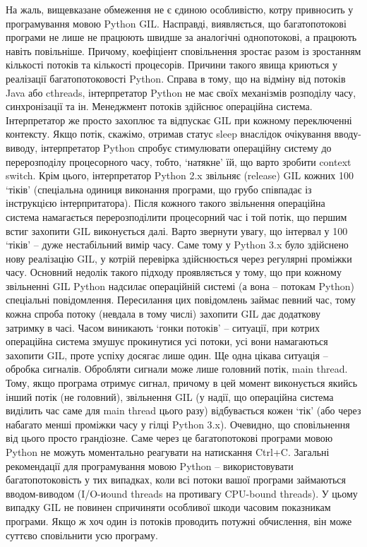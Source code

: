 \documentclass[a4paper, 12pt, onsedie]{article}
\begin{document}
    На жаль, вищевказане обмеження не є єдиною особливістю, котру привносить у програмування
    мовою Python GIL. Насправді, виявляється, що багатопотокові програми не лише не працюють
    швидше за аналогічні однопотокові, а працюють навіть повільніше. Причому, коефіціент
    сповільнення зростає разом із зростанням кількості потоків та кількості процесорів.
    Причини такого явища криються у реалізації багатопотоковості Python. Справа в тому, що
    на відміну від потоків Java або cthreads, інтерпретатор Python не має своїх механізмів
    розподілу часу, синхронізації та ін. Менеджмент потоків здійснює операційна система.
    Інтерпретатор же просто захоплює та відпускає GIL при кожному переключенні контексту.
    Якщо потік, скажімо, отримав статус sleep внаслідок очікування вводу-виводу, 
    інтерпретатор Python спробує стимулювати операційну систему до перерозподілу процесорного
    часу, тобто, `натякне' їй, що варто зробити context switch. Крім цього, інтерпретатор
    Python 2.x звільняє (release) GIL кожних 100 `тіків' 
    (спеціальна одиниця виконання програми, що грубо співпадає із інструкцією інтерпритатора).
    Після кожного такого звільнення операційна система намагається перерозподілити процесорний
    час і той потік, що першим встиг захопити GIL виконується далі. Варто звернути увагу, що
    інтервал у 100 `тіків' -- дуже нестабільний вимір часу. Саме тому у Python 3.x було здійснено
    нову реалізацію GIL, у котрій перевірка здійснюється через регулярні проміжки часу.
    Основний недолік такого підходу проявляється у тому, що при кожному звільненні GIL Python
    надсилає операційній системі (а вона -- потокам Python) спеціальні повідомлення. Пересилання
    цих повідомлень займає певний час, тому кожна спроба потоку (невдала в тому числі) захопити
    GIL дає додаткову затримку в часі. Часом виникають `гонки потоків' -- ситуації, при котрих
    операційна система змушує прокинутися усі потоки, усі вони намагаються захопити GIL, проте
    успіху досягає лише один. Ще одна цікава ситуація -- обробка сигналів. Обробляти сигнали
    може лише головний потік, main thread. Тому, якщо програма отримує сигнал, причому в цей
    момент виконується якийсь інший потік (не головний), звільнення GIL (у надії, що операційна
    система виділить час саме для main thread цього разу) відбувається кожен `тік' (або через
    набагато менші проміжки часу у гілці Python 3.x). Очевидно, що сповільнення від цього
    просто грандіозне. Саме через це багатопотокові програми мовою Python не можуть
    моментально реагувати на натискання Ctrl+C.
    Загальні рекомендації для програмування мовою Python -- використовувати багатопотоковість
    у тих випадках, коли всі потоки вашої програми займаються вводом-виводом (I/O-иound threads
    на противагу CPU-bound threads). У цьому випадку GIL не повинен спричиняти особливої
    шкоди часовим показникам програми. Якщо ж хоч один із потоків проводить потужні обчислення,
    він може суттєво сповільнити усю програму.
\end{document}
